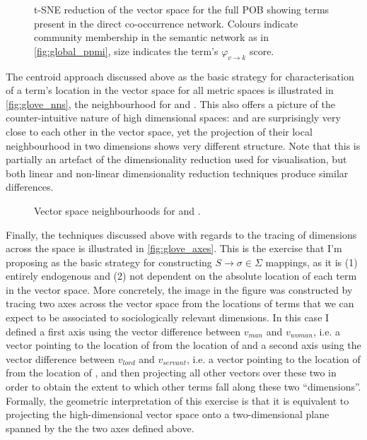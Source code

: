 \begin{figure}
    \centerfloat
    
    \caption[t-SNE reduction of the vector space for the POB]{
        t-SNE reduction of the vector space for the full POB showing terms present in the direct co-occurrence network.
        Colours indicate community membership in the semantic network as in \autoref{fig:global_ppmi}, size indicates the term's $\varphi_{v \rightarrow k}$ score.
    }
    \label{fig:glove_tsne}
\end{figure}

The centroid approach discussed above as the basic strategy for characterisation of a term's location in the vector space for all metric spaces is illustrated in \autoref{fig:glove_nns}, the neighbourhood for  and .
This also offers a picture of the counter-intuitive nature of high dimensional spaces:  and  are surprisingly very close to each other in the vector space, yet the projection of their local neighbourhood in two dimensions shows very different structure.
Note that this is partially an artefact of the dimensionality reduction used for visualisation, but both linear and non-linear dimensionality reduction techniques produce similar differences.

\begin{figure}
    \centerfloat
    
    \caption[Vector space neighbourhoods for  and ]{
        Vector space neighbourhoods for  and .
    }
    \label{fig:glove_nns}
\end{figure}

Finally, the techniques discussed above with regards to the tracing of dimensions across the space is illustrated in \autoref{fig:glove_axes}.
This is the exercise that I'm proposing as the basic strategy for constructing $S \rightarrow \sigma \in \Sigma$ mappings, as it is (1) entirely endogenous and (2) not dependent on the absolute location of each term in the vector space.
More concretely, the image in the figure was constructed by tracing two axes across the vector space from the locations of terms that we can expect to be associated to sociologically relevant dimensions.
In this case I defined a first axis using the vector difference between $v_{man}$ and $v_{woman}$, i.e. a vector pointing to the location of  from the location of  and a second axis using the vector difference between $v_{lord}$ and $v_{servant}$, i.e. a vector pointing to the location of  from the location of , and then projecting all other vectors over these two in order to obtain the extent to which other terms fall along these two ``dimensions''.
Formally, the geometric interpretation of this exercise is that it is equivalent to projecting the high-dimensional vector space onto a two-dimensional plane spanned by the the two axes defined above.

